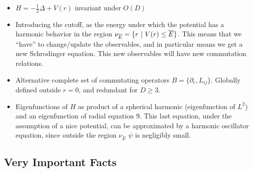 \documentclass{article}
\newcommand{\cut}[1]{\overline{#1}}
\begin{document}
    \begin{itemize}

    \item $H = - \frac{1}{2} \Delta + V(r)$ invariant under $O(D)$
    
    \item Introducing the cutoff, as the energy under which the potential has a harmonic behavior in the region $\nu_{\cut E} = \{r \st V(r) \leq \cut E\}$. This means that we ``have'' to change/update the observables, and in particular means we get a new Schrodinger equation. This new observables will have new commutation relations.
    
    \item Alternative complete set of commutating operators $B = \{\partial_r, L_{ij}\}$. Globally defined outside $r = 0$, and redundant for $D \geq 3$.
    
    \item Eigenfunctions of $H$ as product of a spherical harmonic (eigenfunction of $L^2$) and an eigenfunction of radial equation $9$. This last equation, under the assumption of a nice potential, can be approximated by a harmonic oscillator equation, since outside the region $\nu_{\cut E}$ $\psi$ is negligibly small.
    
    \end{itemize}

\subsection*{Very Important Facts}
\end{document}
